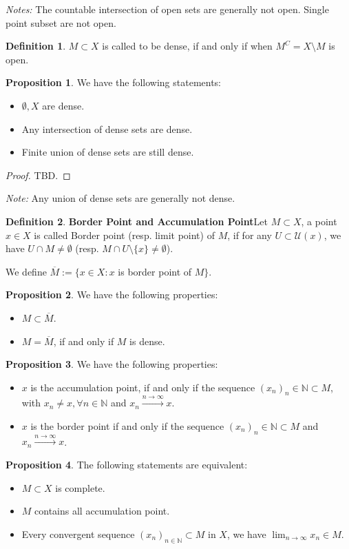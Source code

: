 \documentclass{article}
\theoremstyle{definition}
\newtheorem{defi}{Definition}[subsection]
\newtheorem{prop}{Proposition}[subsection]
\begin{document}
\textit{Notes:} The countable intersection of open sets are generally not open. Single point subset are not open.
\begin{defi}
$M\subset X$ is called to be dense, if and only if when $M^C = X \texttt{\textbackslash} M$ is open.
\end{defi}
\begin{prop}
We have the following statements:
\begin{itemize}
    \item $\emptyset, X$ are dense.
    \item Any intersection of dense sets are dense.
    \item Finite union of dense sets are still dense.
\end{itemize}
\begin{proof}
TBD.
\end{proof}
\end{prop}
\textit{Note:} Any union of dense sets are generally not dense.
\begin{defi}
\textbf{Border Point and Accumulation Point}Let $M\subset X$, a point $x \in X$ is called Border point (resp. limit point) of $M$, if for any $U\subset \mathcal{U}(x)$, we have $U \cap M \neq \emptyset$ (resp. $M \cap U \texttt{\textbackslash} \{x\}\neq \emptyset$).

We define $\overline{M} := \{x\in X: x $ is border point of $M\}$.
\end{defi}
\begin{prop}
We have the following properties:
\begin{itemize}
    \item $M \subset \overline{M}$.
    \item $M=\overline{M}$, if and only if $M$ is dense.
\end{itemize}
\end{prop}
\begin{prop}
We have the following properties:
\begin{itemize}
    \item $x$ is the accumulation point, if and only if the sequence $(x_n)_n\in\mathbb{N}\subset M$, with $x_n\neq x, \forall n\in\mathbb{N}$ and $x_n\xrightarrow{n\to\infty}x$.
    \item $x$ is the border point if and only if the sequence $(x_n)_n\in\mathbb{N}\subset M$ and $x_n\xrightarrow{n\to\infty}x$.
\end{itemize}
\end{prop}
\begin{prop}
The following statements are equivalent:
\begin{itemize}
    \item $M \subset X$ is complete.
    \item $M$ contains all accumulation point.
    \item Every convergent sequence $(x_n)_{n\in\mathbb{N}}\subset M$ in $X$, we have $\lim_{n\to\infty}x_n\in M$.
\end{itemize}
\end{prop}
\end{document}
